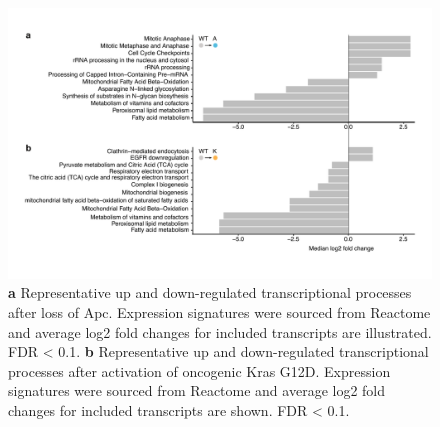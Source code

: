 \begin{flushleft}
 \begin{figure}[h]
\centering
\includegraphics[width=\textwidth,
                height=\textheight,
                keepaspectratio]{figures/adenomaprofiling/pdf/fig_1_6_2.pdf}
\caption{
\textbf{a} Representative up and down-regulated transcriptional processes after loss of Apc. Expression signatures were sourced from Reactome and average log2 fold changes for included transcripts are illustrated. FDR < 0.1.
\textbf{b} Representative up and down-regulated transcriptional processes after activation of oncogenic Kras G12D. Expression signatures were sourced from Reactome and average log2 fold changes for included transcripts are shown. FDR < 0.1.
}
\label{fig_162}
\end{figure}
\bigbreak





\end{flushleft}
